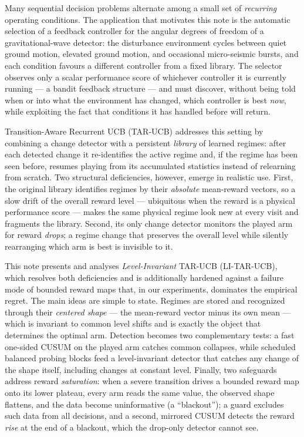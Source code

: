 \documentclass[11pt]{article}
\begin{document}
Many sequential decision problems alternate among a small set of \emph{recurring} operating conditions. The application that motivates this note is the automatic selection of a feedback controller for the angular degrees of freedom of a gravitational-wave detector: the disturbance environment cycles between quiet ground motion, elevated ground motion, and occasional micro-seismic bursts, and each condition favours a different controller from a fixed library. The selector observes only a scalar performance score of whichever controller it is currently running --- a bandit feedback structure --- and must discover, without being told when or into what the environment has changed, which controller is best \emph{now}, while exploiting the fact that conditions it has handled before will return.

Transition-Aware Recurrent UCB (TAR-UCB) addresses this setting by combining a change detector with a persistent \emph{library} of learned regimes: after each detected change it re-identifies the active regime and, if the regime has been seen before, resumes playing from its accumulated statistics instead of relearning from scratch. Two structural deficiencies, however, emerge in realistic use. First, the original library identifies regimes by their \emph{absolute} mean-reward vectors, so a slow drift of the overall reward level --- ubiquitous when the reward is a physical performance score --- makes the same physical regime look new at every visit and fragments the library. Second, its only change detector monitors the played arm for reward \emph{drops}; a regime change that preserves the overall level while silently rearranging which arm is best is invisible to it.

This note presents and analyses \emph{Level-Invariant} TAR-UCB (LI-TAR-UCB), which resolves both deficiencies and is additionally hardened against a failure mode of bounded reward maps that, in our experiments, dominates the empirical regret. The main ideas are simple to state. Regimes are stored and recognized through their \emph{centered shape} --- the mean-reward vector minus its own mean --- which is invariant to common level shifts and is exactly the object that determines the optimal arm. Detection becomes two complementary tests: a fast one-sided CUSUM on the played arm catches common collapses, while scheduled balanced probing blocks feed a level-invariant detector that catches any change of the shape itself, including changes at constant level. Finally, two safeguards address reward \emph{saturation}: when a severe transition drives a bounded reward map onto its lower plateau, every arm reads the same value, the observed shape flattens, and the data become uninformative (a ``blackout''); a guard excludes such data from all decisions, and a second, mirrored CUSUM detects the reward \emph{rise} at the end of a blackout, which the drop-only detector cannot see.
\end{document}
